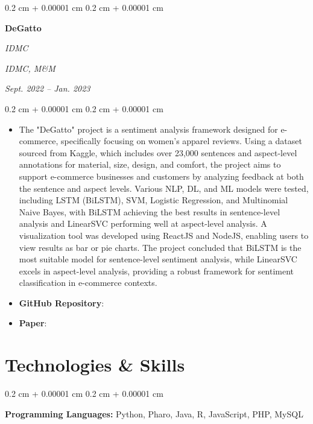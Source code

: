 \documentclass[10pt, letterpaper]{article}
\newenvironment{highlights}{
    \begin{itemize}[
        topsep=0.10 cm,
        parsep=0.10 cm,
        partopsep=0pt,
        itemsep=0pt,
        leftmargin=0.4 cm + 10pt
    ]
}{
    \end{itemize}
} %
\newenvironment{onecolentry}{
    \begin{adjustwidth}{
        0.2 cm + 0.00001 cm
    }{
        0.2 cm + 0.00001 cm
    }
}{
    \end{adjustwidth}
} %
\newenvironment{twocolentry}[2][]{
    \onecolentry
    \def\secondColumn{#2}
    \setcolumnwidth{\fill, 4.5 cm}
    \begin{paracol}{2}
}{
    \switchcolumn \raggedleft \secondColumn
    \end{paracol}
    \endonecolentry
} %
\let\hrefWithoutArrow\href
\renewcommand{\href}[2]{\hrefWithoutArrow{#1}{\ifthenelse{\equal{#2}{}}{ }{#2 }\raisebox{.15ex}{\footnotesize \faExternalLink*}}}
\begin{document}
        \begin{twocolentry}{
            \textit{IDMC, M\&M}    
                
            \textit{Sept. 2022 – Jan. 2023}}
                \textbf{DeGatto}
                
                \textit{IDMC}
        \end{twocolentry}    
        \vspace{0.10 cm}
        \begin{onecolentry}
            \begin{highlights}
              \item The "DeGatto" project is a sentiment analysis framework designed for e-commerce, specifically focusing on women’s apparel reviews. Using a dataset sourced from Kaggle, which includes over 23,000 sentences and aspect-level annotations for material, size, design, and comfort, the project aims to support e-commerce businesses and customers by analyzing feedback at both the sentence and aspect levels. Various NLP, DL, and ML models were tested, including LSTM (BiLSTM), SVM, Logistic Regression, and Multinomial Naive Bayes, with BiLSTM achieving the best results in sentence-level analysis and LinearSVC performing well at aspect-level analysis. A visualization tool was developed using ReactJS and NodeJS, enabling users to view results as bar or pie charts. The project concluded that BiLSTM is the most suitable model for sentence-level sentiment analysis, while LinearSVC excels in aspect-level analysis, providing a robust framework for sentiment classification in e-commerce contexts.      
            \end{highlights}

            \begin{itemize}
                \item \textbf{GitHub Repository}: \href{https://github.com/omarabedelkader/DeGatto/tree/main}{GitHub}
                \item \textbf{Paper}: \href{https://github.com/omarabedelkader/DeGatto/blob/main/paper/DeGatto.pdf}{Paper}
              \end{itemize}                  
        \end{onecolentry}   


    \section{Technologies \& Skills}     
        \begin{onecolentry}
            \textbf{Programming Languages:} Python, Pharo, Java, R, JavaScript, PHP, MySQL
        \end{onecolentry}
        \vspace{0.2 cm}
\end{document}
